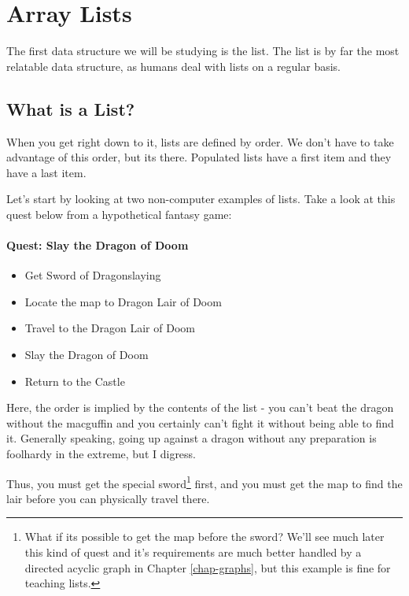 \chapter{Array Lists}
\label{chap:arraylist}
The first data structure we will be studying is the list.
The list is by far the most relatable data structure, as humans deal with lists on a regular basis.

\section{What is a List?}
When you get right down to it, lists are defined by order.
We don't have to take advantage of this order, but its there.
Populated lists have a first item and they have a last item.


Let's start by looking at two non-computer examples of lists.
Take a look at this quest below from a hypothetical fantasy game:

\subsubsection*{Quest: Slay the Dragon of Doom}
\begin{itemize}
	\item Get Sword of Dragonslaying
	\item Locate the map to Dragon Lair of Doom
	\item Travel to the Dragon Lair of Doom 
	\item Slay the Dragon of Doom
	\item Return to the Castle
\end{itemize}

Here, the order is implied by the contents of the list - you can't beat the dragon without the macguffin and you certainly can't fight it without being able to find it.
Generally speaking, going up against a dragon without any preparation is foolhardy in the extreme, but I digress.

Thus, you must get the special sword\footnote{What if its possible to get the map before the sword? We'll see much later this kind of quest and it's requirements are much better handled by a directed acyclic graph in Chapter \ref{chap-graphs}, but this example is fine for teaching lists.} first, and you must get the map to find the lair before you can physically travel there.

